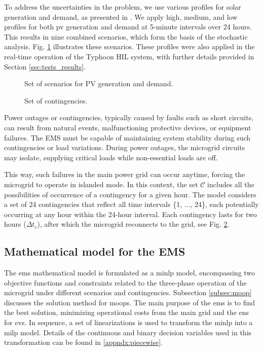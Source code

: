 \documentclass[preprint, 12pt, 3p]{elsarticle}
\begin{document}
To address the uncertainties in the problem, we use various profiles for solar generation and demand, as presented in \cite{silva2023}. We apply high, medium, and low profiles for both \gls{pv} generation and demand at 5-minute intervals over 24 hours. This results in nine combined scenarios, which form the basis of the stochastic analysis. Fig. \ref{fig:scenarios} illustrates these scenarios. These profiles were also applied in the real-time operation of the Typhoon HIL system, with further details provided in Section \ref{sec:tests_results}.


\begin{figure}[ht!]
    \centering
    
    \caption{Set of scenarios for PV generation and demand.} 
    \label{fig:scenarios}
\end{figure}

\begin{figure}[ht!]
    \centering
    
    \caption{Set of contingencies.} 
    \label{fig:outages}
\end{figure}

Power outages or contingencies, typically caused by faults such as short circuits, can result from natural events, malfunctioning protective devices, or equipment failures. The EMS must be capable of maintaining system stability during such contingencies or load variations. During power outages, the microgrid circuits may isolate, supplying critical loads while non-essential loads are off.

This way, such failures in the main power grid can occur anytime, forcing the microgrid to operate in islanded mode. In this context,  the set $\mathcal{C}$ includes all the possibilities of occurrence of a contingency for a given hour. The model considers a set of 
24 contingencies that reflect all time intervals \{1, ..., 24\}, 
each potentially occurring at any hour within the 24-hour interval. 
Each contingency lasts for two hours ($\Delta t_c$), after which the microgrid reconnects to the grid, see Fig. \ref{fig:outages}.

\subsection{Mathematical model for the EMS}

The \gls{ems} mathematical model is formulated as a \gls{minlp} 
model, encompassing two objective functions and constraints related to the 
three-phase operation of the microgrid under different scenarios and 
contingencies. Subsection \ref{subsec:moop} discusses the solution method for 
\glspl{moop}. The main purpose of the \gls{ems} is to find the best solution, minimizing 
operational costs from the main grid and the \gls{ens} for \glspl{ev}. 
In sequence, a set of linearizations is used to transform the 
\gls{minlp} into a \gls{milp} model.  Details of the continuous and binary
decision variables used in this transformation can be found in 
\ref{appndx:piecewise}.
\end{document}

